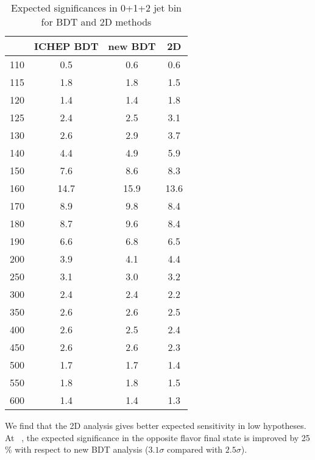\begin{table}[!htb] 
	\centering
	\begin{tabular}{c | c c c }
   	\hline \hline
	\mHi & ICHEP BDT & new BDT & 2D \\
	\hline 
	110	&0.5	&0.6	&0.6 	\\	
	115	&1.8	&1.8	&1.5	\\
	120	&1.4	&1.4	&1.8	\\
	125	&2.4	&2.5	&3.1	\\
	130	&2.6	&2.9	&3.7    \\
	140	&4.4	&4.9	&5.9    \\
	150	&7.6	&8.6	&8.3    \\
	160	&14.7	&15.9	&13.6    \\
	170	&8.9	&9.8	&8.4    \\
	180	&8.7	&9.6	&8.4    \\
	190	&6.6	&6.8	&6.5    \\
	200	&3.9	&4.1	&4.4    \\
	250	&3.1	&3.0	&3.2    \\
	300	&2.4	&2.4	&2.2    \\
	350	&2.6	&2.6	&2.5    \\
	400	&2.6	&2.5	&2.4    \\
	450	&2.6	&2.6	&2.3    \\
	500	&1.7	&1.7	&1.4    \\
	550	&1.8	&1.8	&1.5    \\
	600	&1.4	&1.4	&1.3    \\
   	\hline \hline
	\end{tabular}
	\label{tab:exp_sig_alljet}
	\caption{Expected significances in 0+1+2 jet bin for BDT and 2D methods}
\end{table}

We find that the 2D analysis gives better expected sensitivity in low \mHi hypotheses. 
At \GeV~, the expected significance in the opposite flavor 
final state is improved by 25 \% with respect to new BDT analysis
($3.1 \sigma$ compared with $2.5\sigma$).

